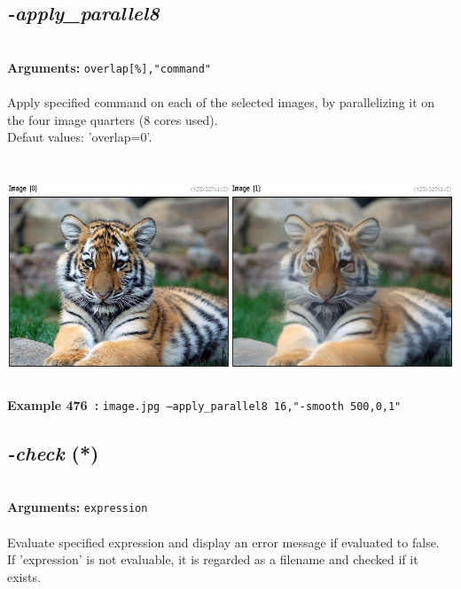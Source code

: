 \documentclass[a4paper,11pt,twoside]{book}
\begin{document}
\subsection{\emph{-apply\_parallel8} }\vspace*{-0.5em}
~\\\textbf{Arguments: } 
{\small \texttt{overlap[\%],"command"}}\\~\\
Apply specified command on each of the selected images, by parallelizing it on the four image quarters (8 cores used).
~\\Defaut values: 'overlap=0'.
\begin{center}\includegraphics[keepaspectratio=true,height=7cm,width=\textwidth]{img/gmic_def476.jpg}\\
{\footnotesize \textbf{Example 476~:} \texttt{image.jpg --apply\_parallel8 16,"-smooth 500,0,1"}}
\end{center}

\subsection{\emph{-check} (*)}\vspace*{-0.5em}
~\\\textbf{Arguments: } 
{\small \texttt{expression}}\\~\\
Evaluate specified expression and display an error message if evaluated to false.
~\\If 'expression' is not evaluable, it is regarded as a filename and checked if it exists.
\end{document}

